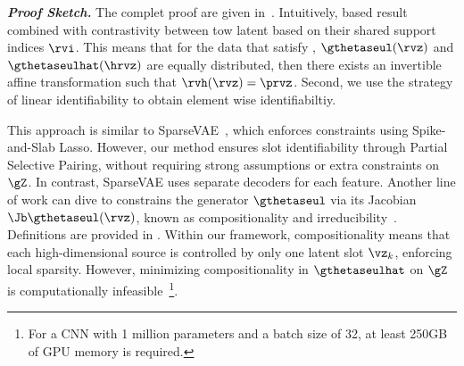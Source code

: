 \documentclass{article} %
\theoremstyle{plain}
\theoremstyle{definition}
\theoremstyle{remark}
\numberwithin{equation}{section}
\begin{document}
\textbf{\it Proof Sketch.} The complet proof are given in~. Intuitively, based result \citep{kivva2022identifiability} combined with contrastivity between tow latent based on their shared support indices $\rvi$. This means that for the data that satisfy , $\gthetaseul(\rvz)$ and $\gthetaseulhat(\hrvz)$ are equally distributed, then there exists an invertible affine transformation such that $\rvh(\rvz)=\prvz$. 
Second, we use the strategy of linear identifiability \citep{lachapelle2022partial} to obtain element wise identifiabiltiy. \par
This approach is similar to SparseVAE~\citep{moran2022identifiable}, which enforces constraints using Spike-and-Slab Lasso. However, our method ensures slot identifiability through Partial Selective Pairing, without requiring strong assumptions or extra constraints on $\gZ$. In contrast, SparseVAE uses separate decoders for each feature. Another line of work can dive to constrains the generator $\gthetaseul$ via its Jacobian $\Jb\gthetaseul(\rvz)$, known as compositionality and irreducibility~\citep{vonkugelgen2021selfsupervised,brady2023provably}. Definitions are provided in . Within our framework, compositionality means that each high-dimensional source is controlled by only one latent slot $\vz_k$, enforcing local sparsity. However, minimizing compositionality in $\gthetaseulhat$ on $\gZ$ is computationally infeasible~\footnote{For a CNN with 1 million parameters and a batch size of 32, at least 250GB of GPU memory is required.}.
\end{document}
